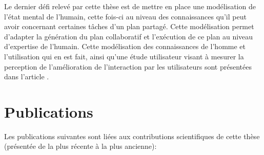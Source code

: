 \documentclass[a4paper,11pt,twoside]{StyleThese}
\begin{document}
Le dernier défi relevé par cette thèse est de mettre en place une modélisation de l'état mental de l'humain, cette fois-ci au niveau des connaissances qu'il peut avoir concernant certaines tâches d'un plan partagé. Cette modélisation permet d'adapter la génération du plan collaboratif et l'exécution de ce plan au niveau d'expertise de l'humain. Cette modélisation des connaissances de l'homme et l'utilisation qui en est fait, ainsi qu'une étude utilisateur visant à mesurer la perception de l'amélioration de l'interaction par les utilisateurs sont présentées dans l'article \cite{Milliez16}.





\section{Publications}

Les publications suivantes sont liées aux contributions scientifiques de cette thèse (présentée de la plus récente à la plus ancienne):
\end{document}
